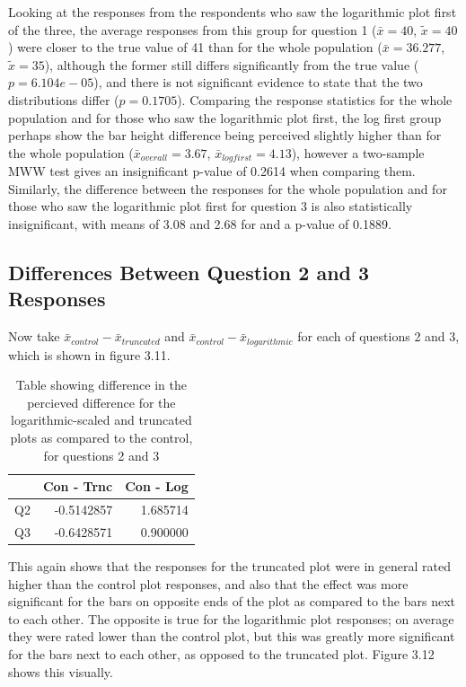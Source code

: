 \documentclass[
  11pt,
]{book}
\begin{document}
Looking at the responses from the respondents who saw the logarithmic
plot first of the three, the average responses from this group for
question 1 (\(\bar{x}=40\), \(\tilde{x}=40\)) were closer to the true
value of 41 than for the whole population (\(\bar{x}=36.277\),
\(\tilde{x}=35\)), although the former still differs significantly from
the true value (\(p=6.104e-05\)), and there is not significant evidence
to state that the two distributions differ (\(p=0.1705\)). Comparing the
response statistics for the whole population and for those who saw the
logarithmic plot first, the log first group perhaps show the bar height
difference being perceived slightly higher than for the whole population
(\(\bar{x}_{overall}=3.67\), \(\bar{x}_{logfirst} = 4.13\)), however a
two-sample MWW test gives an insignificant p-value of 0.2614 when
comparing them. Similarly, the difference between the responses for the
whole population and for those who saw the logarithmic plot first for
question 3 is also statistically insignificant, with means of 3.08 and
2.68 for and a p-value of 0.1889.

\subsection{Differences Between Question 2 and 3 Responses}

Now take \(\bar{x}_{control} - \bar{x}_{truncated}\) and
\(\bar{x}_{control} - \bar{x}_{logarithmic}\) for each of questions 2
and 3, which is shown in figure 3.11.

\begin{table}[!h]

\caption{\label{tab:unnamed-chunk-34}Table showing difference in the percieved difference for the logarithmic-scaled and truncated plots as compared to the control, for questions 2 and 3}
\centering
\begin{tabular}[t]{l|r|r}
\hline
  & Con - Trnc & Con - Log\\
\hline
Q2 & -0.5142857 & 1.685714\\
\hline
Q3 & -0.6428571 & 0.900000\\
\hline
\end{tabular}
\end{table}

This again shows that the responses for the truncated plot were in
general rated higher than the control plot responses, and also that the
effect was more significant for the bars on opposite ends of the plot as
compared to the bars next to each other. The opposite is true for the
logarithmic plot responses; on average they were rated lower than the
control plot, but this was greatly more significant for the bars next to
each other, as opposed to the truncated plot. Figure 3.12 shows this
visually.
\end{document}
